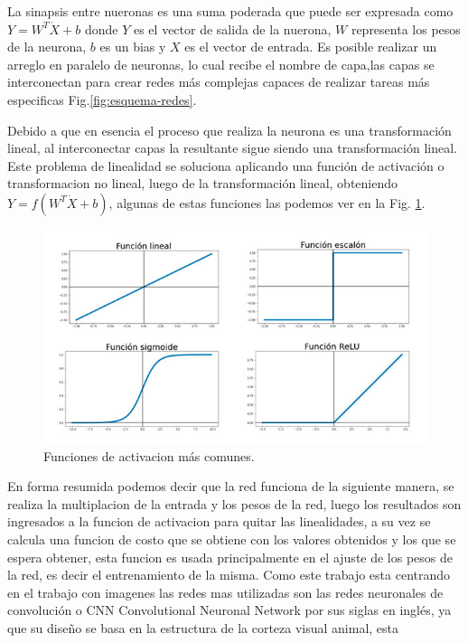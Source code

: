 La sinapsis entre nueronas es una suma poderada que puede ser expresada como $Y =W^T\dot X + b$ donde $Y$ es el vector de salida de la nuerona,
$W$ representa los pesos de la neurona, $b$ es un bias y $X$ es el vector de entrada.
Es posible realizar un arreglo en paralelo de neuronas, lo cual recibe el nombre de capa,las capas se interconectan para crear redes
más complejas capaces de realizar tareas más especificas Fig.\ref*{fig:esquema-redes}.

Debido a que en esencia el proceso que realiza la neurona es una transformación lineal, al interconectar capas la resultante sigue siendo
una transformación lineal. Este problema de linealidad se soluciona aplicando una función de activación o transformacion no lineal,
luego de la transformación lineal, obteniendo $Y= f(W^T \dot X + b)$, algunas de estas funciones las podemos ver en la
Fig. \ref*{fig:funciones-activacion}.
\begin{figure}
    \centering
    \includegraphics[width=1\textwidth]{imgs/Funciones-de-activacion.jpg}
    \caption{Funciones de activacion más comunes.}
    \label{fig:funciones-activacion}
\end{figure}
En forma resumida podemos decir que la red funciona de la siguiente manera, se realiza la multiplacion de la entrada y los pesos de la red,
luego los resultados son ingresados a la funcion de activacion para quitar las linealidades, a su vez se calcula una funcion de costo que se obtiene
con los valores obtenidos y los que se espera obtener, esta funcion es usada principalmente en el ajuste de los pesos de la red, es decir el
entrenamiento de la misma.
Como este trabajo esta centrando en el trabajo con imagenes las redes mas utilizadas son las redes neuronales de convolución o
CNN Convolutional Neuronal Network por sus siglas en inglés, ya que su diseño se basa en la estructura de la corteza visual animal, esta
